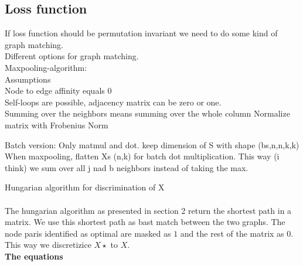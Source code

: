 \subsection{Loss function}

If loss function should be permutation invariant we need to do some kind of graph matching.\\
Different options for graph matching.\\
Maxpooling-algorithm:\\
Assumptions\\
Node to edge affinity equals 0\\

Self-loops are possible, adjacency matrix can be zero or one.\\

Summing over the neighbors means summing over the whole column
Normalize matrix with Frobenius Norm

Batch version:
Only matmul and dot. keep dimension of S with shape (bs,n,n,k,k)
When maxpooling, flatten Xs (n,k) for batch dot multiplication. This way (i think) we sum over all j nad b neighbors instead of taking the max.  


Hungarian algorithm for discrimination of X \\
\\
The hungarian algorithm as presented in section 2 return the shortest path in a matrix. We use this shortest path as bast match between the two graphs. The node paris identified as optimal are masked as $1$ and the rest of the matrix as $0$. This way we discretizice $X\star$ to $X$. 
\\
\textbf{The equations}

